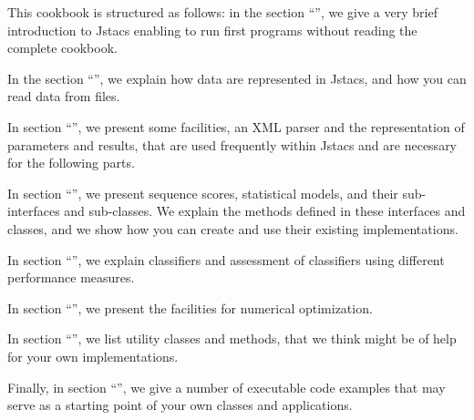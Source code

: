 This cookbook is structured as follows: in the section ``'', we give a very brief introduction to Jstacs enabling to run first programs without reading the complete cookbook. 

In the section ``'', we explain how data are represented in Jstacs, and how you can read data from files. 

In section ``'', we present some facilities, an XML parser and the representation of parameters and results, that are used frequently within Jstacs and are necessary for the following parts. 

In section ``'', we present sequence scores, statistical models, and their sub-interfaces and sub-classes. We explain the methods defined in these interfaces and classes, and we show how you can create and use their existing implementations.

In section ``'', we explain classifiers and assessment of classifiers using different performance measures.

In section ``'', we present the facilities for numerical optimization.

In section ``'', we list utility classes and methods, that we think might be of help for your own implementations.

Finally, in section ``'', we give a number of executable code examples that may serve as a starting point of your own classes and applications.
